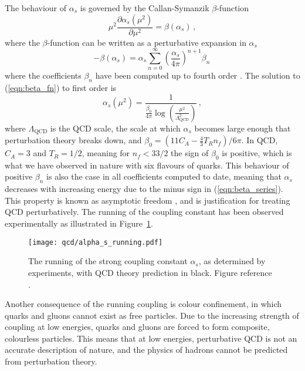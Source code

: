 \documentclass[main.tex]{subfiles}
\begin{document}
    The behaviour of $\alpha_{s}$
    is governed by the Callan-Symanzik \cite{Callan:1970yg,Symanzik:1970rt}
    $\beta$-function
    \begin{equation}\label{eqn:beta_fn}
        \mu^{2} \dfrac{\partial \alpha_{s}(\mu^{2})}{\partial \mu^{2}} = \beta(\alpha_{s}) \, ,
    \end{equation}
    where the $\beta$-function can be written as a perturbative
    expansion in $\alpha_{s}$
    \begin{equation}\label{eqn:beta_series}
        -\beta(\alpha_{s}) = \alpha_{s}\sum_{n=0}^{\infty}\left(\dfrac{\alpha_{s}}{4\pi}\right)^{n+1} \beta_{n}\, 
    \end{equation}
    where the coefficients $\beta_{n}$ have been computed
    up to fourth order \cite{Baikov:2016tgj,Luthe:2017ttg}.
    The solution to (\ref{eqn:beta_fn}) to first order
    is
    \begin{equation}\label{eqn:1l_alpha}
        \alpha_{s}(\mu^{2}) = \dfrac{1}{\frac{\beta_{0}}{4\pi}\log\left(\frac{\mu^{2}}{\Lambda_{\mathrm{QCD}}^{2}}\right)} \, ,
    \end{equation}
    where $\Lambda_{\mathrm{QCD}}$ is the QCD scale,
    the scale at which $\alpha_{s}$ becomes
    large enough that perturbation theory breaks down,
    and $\beta_{0} = (11C_{A} - \frac{4}{3}T_{R}n_{f})/6\pi$.
    In QCD, $C_{A}=3$ and $T_{R}=1/2$, meaning for
    $n_{f} < 33/2$ the sign of $\beta_{0}$ is positive,
    which is what we have observed in nature with six
    flavours of quarks. This behaviour of positive
    $\beta_{n}$ is also the case in all coefficients
    computed to date, meaning that $\alpha_{s}$
    decreases with increasing energy due to the minus sign
    in (\ref{eqn:beta_series}). This property is known as
    asymptotic freedom \cite{Gross:1973id,Politzer:1973fx},
    and is justification for treating QCD perturbatively.
    The running of the coupling constant has been
    observed experimentally as illustrated in Figure~\ref{fig:alpha_s_running}.
    \begin{figure}
        \texttt{[image: qcd/alpha\_s\_running.pdf]}
        \caption{The running of the strong coupling constant $\alpha_{s}$,
        as determined by experiments, with QCD theory prediction in black.
        Figure reference \cite{Workman:2022ynf}.}
        \label{fig:alpha_s_running}
    \end{figure}

    Another consequence of the running coupling
    is colour confinement, in which quarks and
    gluons cannot exist as free particles. Due
    to the increasing strength of coupling at low
    energies, quarks and gluons are forced to
    form composite, colourless particles. This means
    that at low energies, perturbative QCD
    is not an accurate description of nature,
    and the physics of hadrons cannot be predicted
    from perturbation theory.
\end{document}
